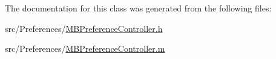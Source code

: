 The documentation for this class was generated from the following files\-:\begin{DoxyCompactItemize}
\item 
src/\-Preferences/\hyperlink{_m_b_preference_controller_8h}{M\-B\-Preference\-Controller.\-h}\item 
src/\-Preferences/\hyperlink{_m_b_preference_controller_8m}{M\-B\-Preference\-Controller.\-m}\end{DoxyCompactItemize}
